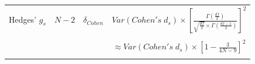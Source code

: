 \documentclass[
  english,
  man,floatsintext]{apa6}
\begin{document}
\begin{landscape}
\begin{longtable}[]{@{}lccc@{}}
\begin{minipage}[t]{0.12\columnwidth}\raggedright
Hedges' \(g_s\)\strut
\end{minipage} & \begin{minipage}[t]{0.11\columnwidth}\centering
\(N-2\)\strut
\end{minipage} & \begin{minipage}[t]{0.24\columnwidth}\centering
\(\delta_{Cohen}\)\strut
\end{minipage} & \begin{minipage}[t]{0.42\columnwidth}\centering
\(Var(Cohen's \; d_s) \times \left[ \frac{\Gamma(\frac{df}{2})}{\sqrt{\frac{df}{2}} \times \Gamma(\frac{df-1}{2})} \right]^2\)\strut
\end{minipage}\tabularnewline
\begin{minipage}[t]{0.12\columnwidth}\raggedright
\strut
\end{minipage} & \begin{minipage}[t]{0.11\columnwidth}\centering
\strut
\end{minipage} & \begin{minipage}[t]{0.24\columnwidth}\centering
\strut
\end{minipage} & \begin{minipage}[t]{0.42\columnwidth}\centering
\strut
\end{minipage}\tabularnewline
\begin{minipage}[t]{0.12\columnwidth}\raggedright
\strut
\end{minipage} & \begin{minipage}[t]{0.11\columnwidth}\centering
\strut
\end{minipage} & \begin{minipage}[t]{0.24\columnwidth}\centering
\strut
\end{minipage} & \begin{minipage}[t]{0.42\columnwidth}\centering
\(\approx Var(Cohen's \; d_s) \times \left[1-\frac{3}{4N-9}\right]^2\)\strut
\end{minipage}\tabularnewline
\begin{minipage}[t]{0.12\columnwidth}\raggedright
\strut
\end{minipage} & \begin{minipage}[t]{0.11\columnwidth}\centering
\strut
\end{minipage} & \begin{minipage}[t]{0.24\columnwidth}\centering
\strut
\end{minipage} & \begin{minipage}[t]{0.42\columnwidth}\centering
\strut
\end{minipage}\tabularnewline
\bottomrule
\end{longtable}


\end{landscape}
\end{document}
